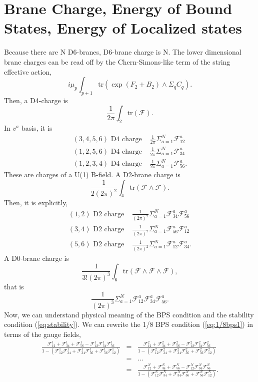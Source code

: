 \documentclass[a4paper,12pt]{article}
\newcommand{\tr}{\mbox{tr}}
\begin{document}
\section{Brane Charge, Energy of Bound States, Energy of Localized states}
Because there are N D6-branes, D6-brane charge is N. The lower dimensional brane charges can be read off by the Chern-Simons-like term of the string effective action,
\[i \mu_p \int_{p+1} \tr(\exp(F_2 + B_2) \wedge \Sigma_q C_q). \]
Then, a D4-charge is 
\[\frac{1}{2\pi}\int_2\tr(\mathcal{F}). \]
In $v^a$ basis, it is
\begin{equation}
 \begin{array}{cc}
(3,4,5,6) \mbox{ D4 charge } & \frac{1}{2\pi} \Sigma_{a=1}^N \mathcal{F}_{12}^a \\
(1,2,5,6) \mbox{ D4 charge } & \frac{1}{2\pi} \Sigma_{a=1}^N \mathcal{F}_{34}^a \\
(1,2,3,4) \mbox{ D4 charge } & \frac{1}{2\pi} \Sigma_{a=1}^N \mathcal{F}_{56}^a.  
\end{array} \label{d4charge}
\end{equation}
These are charges of a U(1) B-field. A D2-brane charge is
\[\frac{1}{2(2\pi)^2}\int_4\tr(\mathcal{F} \wedge \mathcal{F}).\]
Then, it is explicitly,
\begin{equation}
 \begin{array}{cc}
(1,2) \mbox{ D2 charge } & \frac{1}{(2\pi)^2} \Sigma_{a=1}^N \mathcal{F}_{34}^a \mathcal{F}_{56}^a \\
(3,4) \mbox{ D2 charge } & \frac{1}{(2\pi)^2} \Sigma_{a=1}^N \mathcal{F}_{56}^a \mathcal{F}_{12}^a \\
(5,6) \mbox{ D2 charge } & \frac{1}{(2\pi)^2} \Sigma_{a=1}^N \mathcal{F}_{12}^a \mathcal{F}_{34}^a.
\end{array} \label{d2charge}
\end{equation}
A D0-brane charge is 
\[\frac{1}{3!(2\pi)^3}\int_6 \tr(\mathcal{F} \wedge \mathcal{F} \wedge \mathcal{F}),\]
that is
\begin{equation}
\frac{1}{(2\pi)^3}\Sigma_{a=1}^N \mathcal{F}_{12}^a \mathcal{F}_{34}^a \mathcal{F}_{56}^a.  \label{d0charge}
\end{equation}
Now, we can understand physical meaning of the BPS condition and the stability condition (\ref{eq:stability}). We can rewrite the 1/8 BPS condition (\ref{eq:1/8bps1}) in terms of the gauge fields,
\begin{eqnarray}
\frac{\mathcal{F}^1_{12}+\mathcal{F}^1_{34}+\mathcal{F}^1_{56}-\mathcal{F}^1_{12}\mathcal{F}^1_{34}\mathcal{F}^1_{56}}{1-(\mathcal{F}^1_{12}\mathcal{F}^1_{34}+\mathcal{F}^1_{34}\mathcal{F}^1_{56}+\mathcal{F}^1_{56}\mathcal{F}^1_{12})} &=& \frac{\mathcal{F}^2_{12}+\mathcal{F}^2_{34}+\mathcal{F}^2_{56}-\mathcal{F}^2_{12}\mathcal{F}^2_{34}\mathcal{F}^2_{56}}{1-(\mathcal{F}^2_{12}\mathcal{F}^2_{34}+\mathcal{F}^2_{34}\mathcal{F}^2_{56}+\mathcal{F}^2_{56}\mathcal{F}^2_{12})} \nonumber \\
&=& \ldots \nonumber \\
&=& \frac{\mathcal{F}^N_{12}+\mathcal{F}^N_{34}+\mathcal{F}^N_{56}-\mathcal{F}^N_{12}\mathcal{F}^N_{34}\mathcal{F}^N_{56}}{1-(\mathcal{F}^N_{12}\mathcal{F}^N_{34}+\mathcal{F}^N_{34}\mathcal{F}^N_{56}+\mathcal{F}^N_{56}\mathcal{F}^N_{12})}.
\end{eqnarray}
\end{document}
